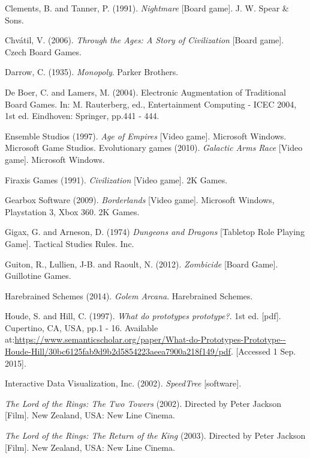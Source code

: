 \documentclass[a4paper,11pt]{report}
\begin{document}
\begin{thebibliography}{1}
Clements, B. and Tanner, P. (1991). \textit{Nightmare} [Board game]. J. W. Spear \& Sons.

Chvátil, V. (2006). \textit{Through the Ages: A Story of Civilization} [Board game]. Czech Board Games.

Darrow, C. (1935). \textit{Monopoly}. Parker Brothers.

De Boer, C. and Lamers, M. (2004). Electronic Augmentation of Traditional Board Games. In: M. Rauterberg, ed., Entertainment Computing - ICEC 2004, 1st ed. Eindhoven: Springer, pp.441 - 444.


Ensemble Studios (1997). \textit{Age of Empires} [Video game].  Microsoft Windows. Microsoft Game Studios. 
Evolutionary games (2010). \textit{Galactic Arms Race} [Video game]. Microsoft Windows. 

Firaxis Games (1991). \textit{Civilization}  [Video game]. 2K Games.
 
Gearbox Software (2009). \textit{Borderlands} [Video game]. Microsoft Windows, Playstation 3, Xbox 360. 2K Games.

Gigax, G. and Arneson, D. (1974) \textit{Dungeons and Dragons} [Tabletop Role Playing Game]. Tactical Studies Rules. Inc.

Guiton, R., Lullien, J-B. and Raoult, N. (2012). \textit{Zombicide} [Board Game]. Guillotine Games.

Harebrained Schemes (2014). \textit{Golem Arcana}. Harebrained Schemes.

Houde, S. and Hill, C. (1997). \textit{What do prototypes prototype?}. 1st ed. [pdf]. Cupertino, CA, USA, pp.1 - 16. Available at:\url{https://www.semanticscholar.org/paper/What-do-Prototypes-Prototype--Houde-Hill/30bc6125fab9d9b2d5854223aeea7900a218f149/pdf}. [Accessed 1 Sep. 2015].

Interactive Data Visualization, Inc. (2002). \textit{SpeedTree} [software]. 

\textit{The Lord of the Rings: The Two Towers} (2002). Directed by Peter Jackson [Film]. New Zealand, USA: New Line Cinema.

\textit{The Lord of the Rings: The Return of the King} (2003). Directed by Peter Jackson [Film]. New Zealand, USA: New Line Cinema.


\end{thebibliography}
\end{document}
